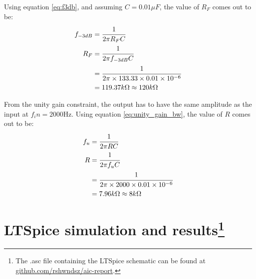\documentclass[12pt, titlepage]{article}
\theoremstyle{definition}
\begin{document}
    Using equation \ref{eq:f3db}, and assuming \underline{$C = 0.01\mu F$}, the value of \underline{$R_F$} comes out to be:
    \begin{align*}
      f_{-3dB} &= \cfrac{1}{2\pi R_FC} \\
      R_F &= \cfrac{1}{2\pi f_{-3dB}C} \\
      &= \cfrac{1}{2\pi \times 133.33 \times 0.01 \times 10^{-6}} \\
      &= 119.37k\Omega \approx 120k\Omega
    \end{align*}

    From the unity gain constraint, the output has to have the same amplitude as the input at $f_in = 2000\text{Hz}$.
    Using equation \ref{eq:unity_gain_bw}, the value of \underline{$R$} comes out to be:
    \begin{align*}
      f_u &= \cfrac{1}{2\pi RC} \\
      R &= \cfrac{1}{2\pi f_uC}\\
      &= \cfrac{1}{2\pi \times 2000 \times 0.01 \times 10^{-6}} \\
      &= 7.96k\Omega \approx 8k\Omega
    \end{align*}


  \newpage
  \section[LTSpice simulation and results]{LTSpice simulation and results\footnote{The .asc file containing the LTSpice schematic can be found at \href{https://github.com/rshwndsz/aic-report/blob/master/lab5.asc}{github.com/rshwndsz/aic-report}.}}
\end{document}

